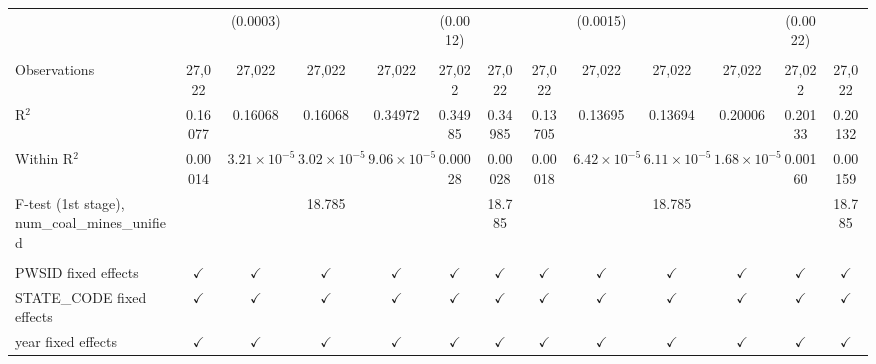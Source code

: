 \begin{table}[htbp]
\begin{adjustbox}{width = \textwidth, center}
\begin{tabular}{lcccccccccccc}
                                                          &               & (0.0003)              &                       &                       & (0.0012)      &               &               & (0.0015)              &                       &                       & (0.0022)        &   \\   
          \\
         Observations                                     & 27,022        & 27,022                & 27,022                & 27,022                & 27,022        & 27,022        & 27,022        & 27,022                & 27,022                & 27,022                & 27,022          & 27,022\\  
         R$^2$                                            & 0.16077       & 0.16068               & 0.16068               & 0.34972               & 0.34985       & 0.34985       & 0.13705       & 0.13695               & 0.13694               & 0.20006               & 0.20133         & 0.20132\\  
         Within R$^2$                                     & 0.00014       & $3.21\times 10^{-5}$  & $3.02\times 10^{-5}$  & $9.06\times 10^{-5}$  & 0.00028       & 0.00028       & 0.00018       & $6.42\times 10^{-5}$  & $6.11\times 10^{-5}$  & $1.68\times 10^{-5}$  & 0.00160         & 0.00159\\  
         F-test (1st stage), num\_coal\_mines\_unified    &               &                       & 18.785                &                       &               & 18.785        &               &                       & 18.785                &                       &                 & 18.785\\  
          \\
         PWSID fixed effects                              & $\checkmark$  & $\checkmark$          & $\checkmark$          & $\checkmark$          & $\checkmark$  & $\checkmark$  & $\checkmark$  & $\checkmark$          & $\checkmark$          & $\checkmark$          & $\checkmark$    & $\checkmark$\\   
         STATE\_CODE fixed effects                        & $\checkmark$  & $\checkmark$          & $\checkmark$          & $\checkmark$          & $\checkmark$  & $\checkmark$  & $\checkmark$  & $\checkmark$          & $\checkmark$          & $\checkmark$          & $\checkmark$    & $\checkmark$\\   
         year fixed effects                               & $\checkmark$  & $\checkmark$          & $\checkmark$          & $\checkmark$          & $\checkmark$  & $\checkmark$  & $\checkmark$  & $\checkmark$          & $\checkmark$          & $\checkmark$          & $\checkmark$    & $\checkmark$\\   
         \bottomrule
      \end{tabular}
   \end{adjustbox}
\end{table}


